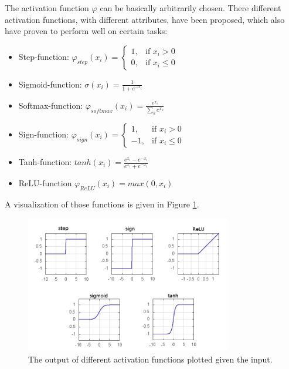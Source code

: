 The activation function $\varphi$ can be basically arbitrarily chosen. 
There different activation functions, with different attributes, have been proposed, which also have proven to perform well on certain tasks:

\begin{itemize}
	\item Step-function: $\varphi_{step}(x_i) = \begin{cases} 1, & \text{if  } x_i > 0 \\ 0, & \text{if  } x_i \le 0  \end{cases}$
	\item Sigmoid-function: $\sigma(x_i) = \frac{1}{1 + e^{-x_i}}$ 
	\item Softmax-function: $\varphi_{softmax}(x_i) = \frac{e^{x_i}}{\sum_k e^{x_k}}$ 
	\item Sign-function: $\varphi_{sign}(x_i) = \begin{cases} 1, & \text{if  } x_i > 0 \\ -1, & \text{if  } x_i \le 0  \end{cases}$
	\item Tanh-function: $tanh(x_i) = \frac{e^{x_i} - e^{-x_i}}{e^{x_i} + e^{-x_i}}$
	\item ReLU-function $\varphi_{ReLU}(x_i) = max(0, x_i)$
\end{itemize}

A visualization of those functions is given in Figure \ref{fig:activations}.

\begin{figure}
	\centering
    	\includegraphics[width=0.8\textwidth]{imgs/act_fun.png} 
    \caption{The output of different activation functions plotted given the input.}
	\label{fig:activations}
\end{figure}

